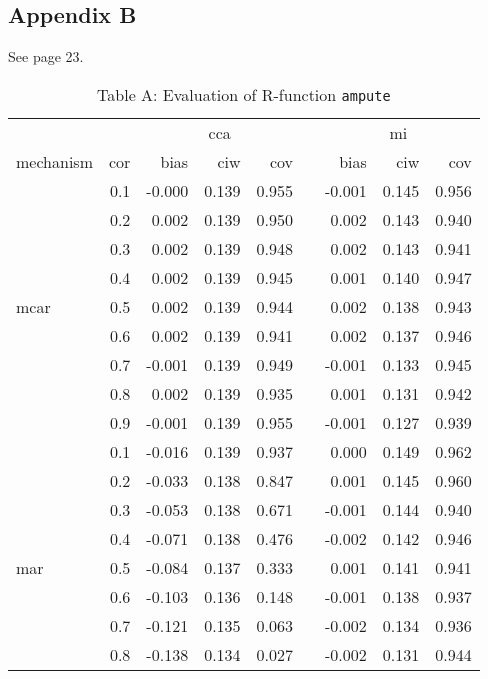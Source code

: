 \documentclass[11pt,a4paper]{article}
\newcommand{\code}[1]{\texttt{#1}}
\begin{document}
\subsection*{Appendix B}

See page 23.

\begin{table}[h!]
\centering
\captionsetup{justification=justified,singlelinecheck=false,width = 0.73\textwidth}
\caption*{\normalsize Table A: Evaluation of R-function \code{ampute}}
  \label{A}
\begin{tabular}{lrrrrrrrr}
  \hline
&& \multicolumn{3}{c}{cca} && \multicolumn{3}{c}{mi} \\
\cline{3-5} \cline{7-9}
mechanism & cor & bias & ciw & cov && bias & ciw & cov \\
\hline
 & 0.1 & -0.000 & 0.139 & 0.955 &  & -0.001 & 0.145 & 0.956 \\ 
   & 0.2 & 0.002 & 0.139 & 0.950 &  & 0.002 & 0.143 & 0.940 \\ 
   & 0.3 & 0.002 & 0.139 & 0.948 &  & 0.002 & 0.143 & 0.941 \\ 
   & 0.4 & 0.002 & 0.139 & 0.945 &  & 0.001 & 0.140 & 0.947 \\ 
  mcar & 0.5 & 0.002 & 0.139 & 0.944 &  & 0.002 & 0.138 & 0.943 \\ 
   & 0.6 & 0.002 & 0.139 & 0.941 &  & 0.002 & 0.137 & 0.946 \\ 
   & 0.7 & -0.001 & 0.139 & 0.949 &  & -0.001 & 0.133 & 0.945 \\ 
   & 0.8 & 0.002 & 0.139 & 0.935 &  & 0.001 & 0.131 & 0.942 \\ 
   & 0.9 & -0.001 & 0.139 & 0.955 &  & -0.001 & 0.127 & 0.939 \\ 
   \cline{2-9}
   & 0.1 & -0.016 & 0.139 & 0.937 &  & 0.000 & 0.149 & 0.962 \\ 
   & 0.2 & -0.033 & 0.138 & 0.847 &  & 0.001 & 0.145 & 0.960 \\ 
   & 0.3 & -0.053 & 0.138 & 0.671 &  & -0.001 & 0.144 & 0.940 \\ 
   & 0.4 & -0.071 & 0.138 & 0.476 &  & -0.002 & 0.142 & 0.946 \\ 
  mar & 0.5 & -0.084 & 0.137 & 0.333 &  & 0.001 & 0.141 & 0.941 \\ 
   & 0.6 & -0.103 & 0.136 & 0.148 &  & -0.001 & 0.138 & 0.937 \\ 
   & 0.7 & -0.121 & 0.135 & 0.063 &  & -0.002 & 0.134 & 0.936 \\ 
   & 0.8 & -0.138 & 0.134 & 0.027 &  & -0.002 & 0.131 & 0.944 \\ 

\end{tabular}
\end{table}
\end{document}
